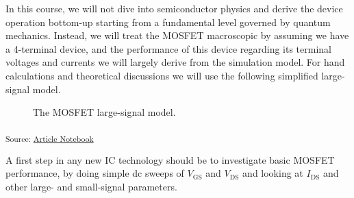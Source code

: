 \documentclass[
  a4paper,
  DIV=11,
  numbers=noendperiod]{scrartcl}
\begin{document}
In this course, we will not dive into semiconductor physics and derive
the device operation bottom-up starting from a fundamental level
governed by quantum mechanics. Instead, we will treat the MOSFET
macroscopic by assuming we have a 4-terminal device, and the performance
of this device regarding its terminal voltages and currents we will
largely derive from the simulation model. For hand calculations and
theoretical discussions we will use the following simplified
large-signal model.

\begin{figure}[H]


\caption{\label{fig-mosfet-large-signal-model}The MOSFET large-signal
model.}

\end{figure}%

\textsubscript{Source:
\href{https://iic-jku.github.io/analog-circuit-design/index.qmd.html}{Article
Notebook}}

A first step in any new IC technology should be to investigate basic
MOSFET performance, by doing simple dc sweeps of \(V_\mathrm{GS}\) and
\(V_\mathrm{DS}\) and looking at \(I_\mathrm{DS}\) and other large- and
small-signal parameters.
\end{document}
